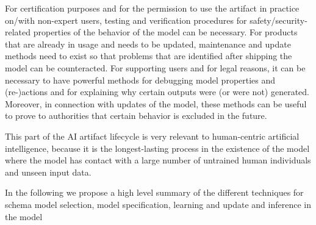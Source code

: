 For certification purposes and for the permission to use the artifact in practice on/with non-expert users, testing and verification procedures for safety/security-related properties of the behavior of the model can be necessary.
%
For products that are already in usage and needs to be updated,
maintenance and update methods need to exist so that problems that are identified after shipping the model can be counteracted.
%
For supporting users and for legal reasons, it can be necessary to have powerful methods for debugging model properties and (re-)actions and for explaining why certain outputs were (or were not) generated. Moreover, in connection with updates of the model, these methods can be useful to prove to authorities that certain behavior is excluded in the future.

This part of the AI artifact lifecycle is very relevant to human-centric artificial intelligence, because it is the longest-lasting process in the existence of the model where the model has contact with a large number of untrained human individuals and unseen input data.


In the following we propose a high level summary of the different
techniques for schema model selection, model specification, learning
and update and inference in the model
